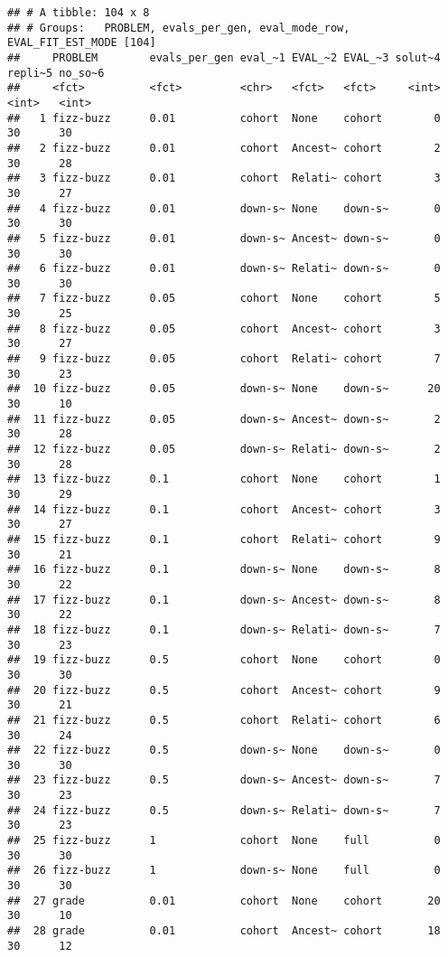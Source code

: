 \documentclass[
]{book}
\begin{document}
\begin{verbatim}
## # A tibble: 104 x 8
## # Groups:   PROBLEM, evals_per_gen, eval_mode_row, EVAL_FIT_EST_MODE [104]
##     PROBLEM        evals_per_gen eval_~1 EVAL_~2 EVAL_~3 solut~4 repli~5 no_so~6
##     <fct>          <fct>         <chr>   <fct>   <fct>     <int>   <int>   <int>
##   1 fizz-buzz      0.01          cohort  None    cohort        0      30      30
##   2 fizz-buzz      0.01          cohort  Ancest~ cohort        2      30      28
##   3 fizz-buzz      0.01          cohort  Relati~ cohort        3      30      27
##   4 fizz-buzz      0.01          down-s~ None    down-s~       0      30      30
##   5 fizz-buzz      0.01          down-s~ Ancest~ down-s~       0      30      30
##   6 fizz-buzz      0.01          down-s~ Relati~ down-s~       0      30      30
##   7 fizz-buzz      0.05          cohort  None    cohort        5      30      25
##   8 fizz-buzz      0.05          cohort  Ancest~ cohort        3      30      27
##   9 fizz-buzz      0.05          cohort  Relati~ cohort        7      30      23
##  10 fizz-buzz      0.05          down-s~ None    down-s~      20      30      10
##  11 fizz-buzz      0.05          down-s~ Ancest~ down-s~       2      30      28
##  12 fizz-buzz      0.05          down-s~ Relati~ down-s~       2      30      28
##  13 fizz-buzz      0.1           cohort  None    cohort        1      30      29
##  14 fizz-buzz      0.1           cohort  Ancest~ cohort        3      30      27
##  15 fizz-buzz      0.1           cohort  Relati~ cohort        9      30      21
##  16 fizz-buzz      0.1           down-s~ None    down-s~       8      30      22
##  17 fizz-buzz      0.1           down-s~ Ancest~ down-s~       8      30      22
##  18 fizz-buzz      0.1           down-s~ Relati~ down-s~       7      30      23
##  19 fizz-buzz      0.5           cohort  None    cohort        0      30      30
##  20 fizz-buzz      0.5           cohort  Ancest~ cohort        9      30      21
##  21 fizz-buzz      0.5           cohort  Relati~ cohort        6      30      24
##  22 fizz-buzz      0.5           down-s~ None    down-s~       0      30      30
##  23 fizz-buzz      0.5           down-s~ Ancest~ down-s~       7      30      23
##  24 fizz-buzz      0.5           down-s~ Relati~ down-s~       7      30      23
##  25 fizz-buzz      1             cohort  None    full          0      30      30
##  26 fizz-buzz      1             down-s~ None    full          0      30      30
##  27 grade          0.01          cohort  None    cohort       20      30      10
##  28 grade          0.01          cohort  Ancest~ cohort       18      30      12

\end{verbatim}
\end{document}
